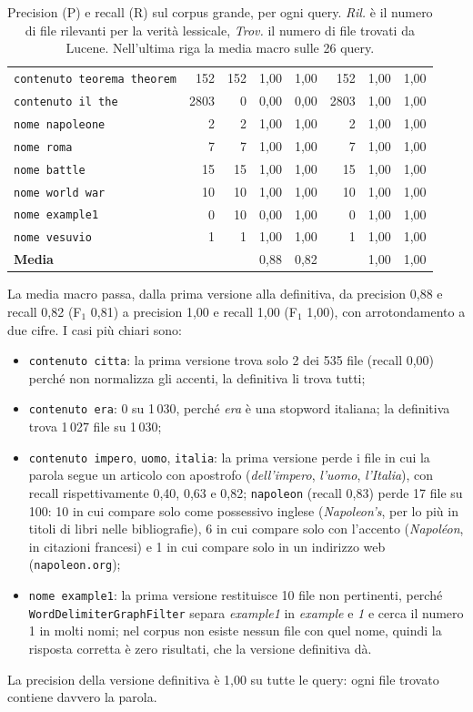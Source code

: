 \documentclass[11pt,a4paper]{article}
\newcommand{\dq}{\textquotedbl}            %
\newcommand{\code}[1]{\texttt{#1}}
\begin{document}
\begin{table}[H]
\begin{tabularx}{\linewidth}{@{}Xrrrrrrr@{}}
\code{contenuto teorema theorem} & 152 & 152 & 1,00 & 1,00 & 152 & 1,00 & 1,00 \\
\code{contenuto il the} & 2803 & 0 & 0,00 & 0,00 & 2803 & 1,00 & 1,00 \\
\code{nome napoleone} & 2 & 2 & 1,00 & 1,00 & 2 & 1,00 & 1,00 \\
\code{nome roma} & 7 & 7 & 1,00 & 1,00 & 7 & 1,00 & 1,00 \\
\code{nome battle} & 15 & 15 & 1,00 & 1,00 & 15 & 1,00 & 1,00 \\
\code{nome \dq{}world war\dq{}} & 10 & 10 & 1,00 & 1,00 & 10 & 1,00 & 1,00 \\
\code{nome example1} & 0 & 10 & 0,00 & 1,00 & 0 & 1,00 & 1,00 \\
\code{nome vesuvio} & 1 & 1 & 1,00 & 1,00 & 1 & 1,00 & 1,00 \\
\midrule
\textbf{Media} & & & 0,88 & 0,82 & & 1,00 & 1,00 \\
\bottomrule
\end{tabularx}
\caption{Precision (P) e recall (R) sul corpus grande, per ogni query. \emph{Ril.} è il
numero di file rilevanti per la verità lessicale, \emph{Trov.} il numero di file
trovati da Lucene. Nell'ultima riga la media macro sulle 26 query.}
\label{tab:valutazione}
\end{table}

La media macro passa, dalla prima versione alla definitiva, da precision 0,88 e recall
0,82 (F$_1$ 0,81) a precision 1,00 e recall 1,00 (F$_1$ 1,00), con arrotondamento a due cifre.
I casi più chiari sono:
\begin{itemize}
  \item \code{contenuto citta}: la prima versione trova solo 2 dei 535 file
        (recall 0,00) perché non normalizza gli accenti, la definitiva li trova tutti;
  \item \code{contenuto era}: 0 su 1\,030, perché \emph{era} è una stopword italiana;
        la definitiva trova 1\,027 file su 1\,030;
  \item \code{contenuto impero}, \code{uomo}, \code{italia}: la prima versione perde
        i file in cui la parola segue un articolo con apostrofo (\emph{dell'impero},
        \emph{l'uomo}, \emph{l'Italia}), con recall rispettivamente 0,40, 0,63 e
        0,82; \code{napoleon} (recall 0,83) perde 17 file su 100: 10 in cui compare
        solo come possessivo inglese (\emph{Napoleon's}, per lo più in titoli di libri
        nelle bibliografie), 6 in cui compare solo con l'accento (\emph{Napoléon},
        in citazioni francesi) e 1 in cui compare solo in un indirizzo web
        (\code{napoleon.org});
  \item \code{nome example1}: la prima versione restituisce 10 file non pertinenti,
        perché \code{WordDelimiterGraphFilter} separa \emph{example1} in
        \emph{example} e \emph{1} e cerca il numero 1 in molti nomi; nel corpus non
        esiste nessun file con quel nome, quindi la risposta corretta è zero
        risultati, che la versione definitiva dà.
\end{itemize}
La precision della versione definitiva è 1,00 su tutte le query: ogni file trovato
contiene davvero la parola.
\end{document}
